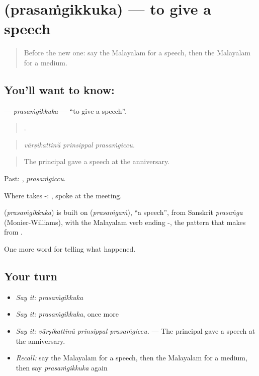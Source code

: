 \section[\texorpdfstring{\ml{പ്രസംഗിക്കുക} (prasaṁgikkuka)}{പ്രസംഗിക്കുക (prasaṁgikkuka)}]{ (prasaṁgikkuka) — to give a speech}

\label{lesson:ML-C354-prasamgikkuka}



\begin{quote}
Before the new one: say the Malayalam for a speech, then the Malayalam for a medium.
\end{quote}

\subsection*{You'll want to know: }
\textbf{} — \emph{prasaṁgikkuka} — \textquotedblleft{}to give a speech\textquotedblright{}.

\begin{quote}
  .
\end{quote}

\begin{quote}
\emph{vārṣikattinŭ prinsippal prasaṁgiccu.}
\end{quote}

\begin{quote}
The principal gave a speech at the anniversary.
\end{quote}

Past: , \emph{prasaṁgiccu}.

Where takes -:  , spoke at the meeting.

\begin{cousinweb}
\textbf{} (\emph{prasaṁgikkuka}) is built on  (\emph{prasaṁgaṁ}), \textquotedblleft{}a speech\textquotedblright{}, from Sanskrit \emph{prasaṅga} (Monier-Williams), with the Malayalam verb ending -, the pattern that makes  from .
\end{cousinweb}

\begin{grammarlens}[title={What you've built}]
One more word for telling what happened.
\end{grammarlens}

\subsection*{Your turn}
\begin{itemize}
\raggedright
  \item \emph{Say it:} \emph{prasaṁgikkuka}
  \item \emph{Say it:} \emph{prasaṁgikkuka}, once more
  \item \emph{Say it:} \emph{vārṣikattinŭ prinsippal prasaṁgiccu.} — The principal gave a speech at the anniversary.
  \item \emph{Recall:} say the Malayalam for a speech, then the Malayalam for a medium, then say \emph{prasaṁgikkuka} again
\end{itemize}


